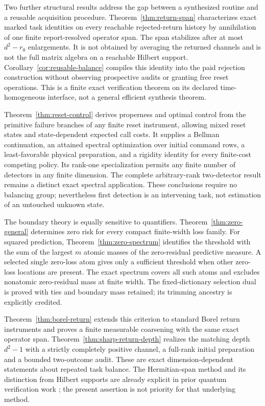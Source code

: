 Two further structural results address the gap between a synthesized routine and a reusable acquisition procedure. Theorem~\ref{thm:return-span} characterizes exact marked task identities on every reachable rejected-return history by annihilation of one finite report-resolved operator span. The span stabilizes after at most $d^2-r_0$ enlargements. It is not obtained by averaging the returned channels and is not the full matrix algebra on a reachable Hilbert support. Corollary~\ref{cor:reusable-balance} compiles this identity into the paid rejection construction without observing prospective audits or granting free reset operations. This is a finite exact verification theorem on its declared time-homogeneous interface, not a general efficient synthesis theorem.

Theorem~\ref{thm:reset-control} derives properness and optimal control from the primitive failure branches of any finite reset instrument, allowing mixed reset states and state-dependent expected call costs. It supplies a Bellman continuation, an attained spectral optimization over initial command rows, a least-favorable physical preparation, and a rigidity identity for every finite-cost competing policy. Its rank-one specialization permits any finite number of detectors in any finite dimension. The complete arbitrary-rank two-detector result remains a distinct exact spectral application. These conclusions require no balancing group; nevertheless first detection is an intervening task, not estimation of an untouched unknown state.

The boundary theory is equally sensitive to quantifiers. Theorem~\ref{thm:zero-general} determines zero risk for every compact finite-width loss family. For squared prediction, Theorem~\ref{thm:zero-spectrum} identifies the threshold with the sum of the largest $m$ atomic masses of the zero-residual predictive measure. A selected single zero-loss atom gives only a sufficient threshold when other zero-loss locations are present. The exact spectrum covers all such atoms and excludes nonatomic zero-residual mass at finite width. The fixed-dictionary selection dual is proved with ties and boundary mass retained; its trimming ancestry is explicitly credited.

Theorem~\ref{thm:borel-return} extends this criterion to standard Borel return instruments and proves a finite measurable coarsening with the same exact operator span. Theorem~\ref{thm:sharp-return-depth} realizes the matching depth $d^2-1$ with a strictly completely positive channel, a full-rank initial preparation and a bounded two-outcome audit. These are exact dimension-dependent statements about repeated task balance. The Hermitian-span method and its distinction from Hilbert supports are already explicit in prior quantum verification work \cite{Fu24}; the present assertion is not priority for that underlying method.

